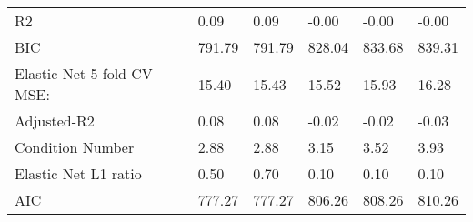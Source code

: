 \begin{table}
\begin{center}
\begin{tabular}{llllll}
R2                                             & 0.09    & 0.09    & -0.00  & -0.00   & -0.00     \\
BIC                                            & 791.79  & 791.79  & 828.04 & 833.68  & 839.31    \\
Elastic Net 5-fold CV MSE:                     & 15.40   & 15.43   & 15.52  & 15.93   & 16.28     \\
Adjusted-R2                                    & 0.08    & 0.08    & -0.02  & -0.02   & -0.03     \\
Condition Number                               & 2.88    & 2.88    & 3.15   & 3.52    & 3.93      \\
Elastic Net L1 ratio                           & 0.50    & 0.70    & 0.10   & 0.10    & 0.10      \\
AIC                                            & 777.27  & 777.27  & 806.26 & 808.26  & 810.26    \\
\hline
\end{tabular}
\end{center}
\end{table}